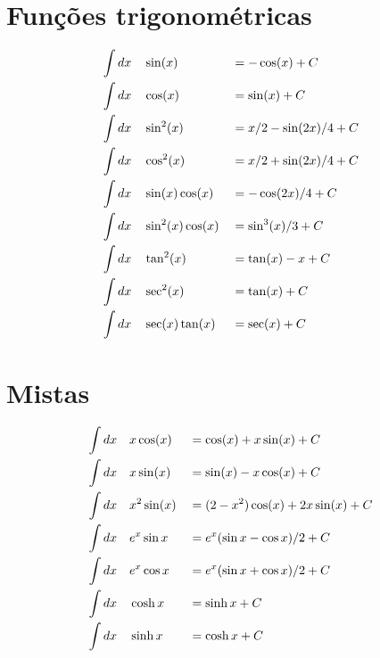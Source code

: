 \documentclass[a4paper,12pt]{article}
\newcommand\pair[2]{\ensuremath{\int dx&\quad#1 &&= #2 + C}}
\begin{document}
  \section{Funções trigonométricas}
  \begin{align*}
    \pair{\sin(x)}{-\cos(x)} \\
    \pair{\cos(x)}{\sin(x)} \\
    \pair{\sin^2(x)}{x/2-\sin(2x)/4} \\
    \pair{\cos^2(x)}{x/2+\sin(2x)/4} \\
    \pair{\sin(x)\cos(x)}{-\cos(2x)/4} \\
    \pair{\sin^2(x)\cos(x)}{\sin^3(x)/3} \\
    \pair{\tan^2(x)}{\tan(x)-x} \\
    \pair{\sec^2(x)}{\tan(x)} \\
    \pair{\sec(x)\tan(x)}{\sec(x)}
  \end{align*}

  \section{Mistas}
  \begin{align*}
    \pair{x\cos(x)}{\cos(x)+x\sin(x)} \\
    \pair{x\sin(x)}{\sin(x)-x\cos(x)} \\
    \pair{x^2\sin(x)}{(2-x^2)\cos(x)+2x\sin(x)} \\
    \pair{e^x\sin x}{e^x(\sin x-\cos x)/2} \\
    \pair{e^x\cos x}{e^x(\sin x+\cos x)/2} \\
    \pair{\cosh x}{\sinh x} \\
    \pair{\sinh x}{\cosh x}
  \end{align*}


  
  
\end{document}

